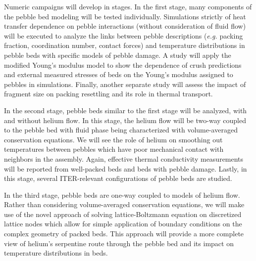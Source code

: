 Numeric campaigns will develop in stages. In the first stage, many components of the pebble bed modeling will be tested individually. Simulations strictly of heat transfer dependence on pebble interactions (without consideration of fluid flow) will be executed to analyze the links between pebble descriptions (\textit{e.g.} packing fraction, coordination number, contact forces) and temperature distributions in pebble beds with specific models of pebble damage. A study will apply the modified Young's modulus model to show the dependence of crush predictions and external measured stresses of beds on the Young's modulus assigned to pebbles in simulations. Finally, another separate study will assess the impact of fragment size on packing resettling and its role in thermal transport.

In the second stage, pebble beds similar to the first stage will be analyzed, with and without helium flow. In this stage, the helium flow will be two-way coupled to the pebble bed with fluid phase being characterized with volume-averaged conservation equations. We will see the role of helium on smoothing out temperatures between pebbles which have poor mechanical contact with neighbors in the assembly. Again, effective thermal conductivity measurements will be reported from well-packed beds and beds with pebble damage. Lastly, in this stage, several ITER-relevant configurations of pebble beds are studied. 

In the third stage, pebble beds are one-way coupled to models of helium flow. Rather than considering volume-averaged conservation equations, we will make use of the novel approach of solving lattice-Boltzmann equation on discretized lattice nodes which allow for simple application of boundary conditions on the complex geometry of packed beds. This approach will provide a more complete view of helium's serpentine route through the pebble bed and its impact on temperature distributions in beds.




